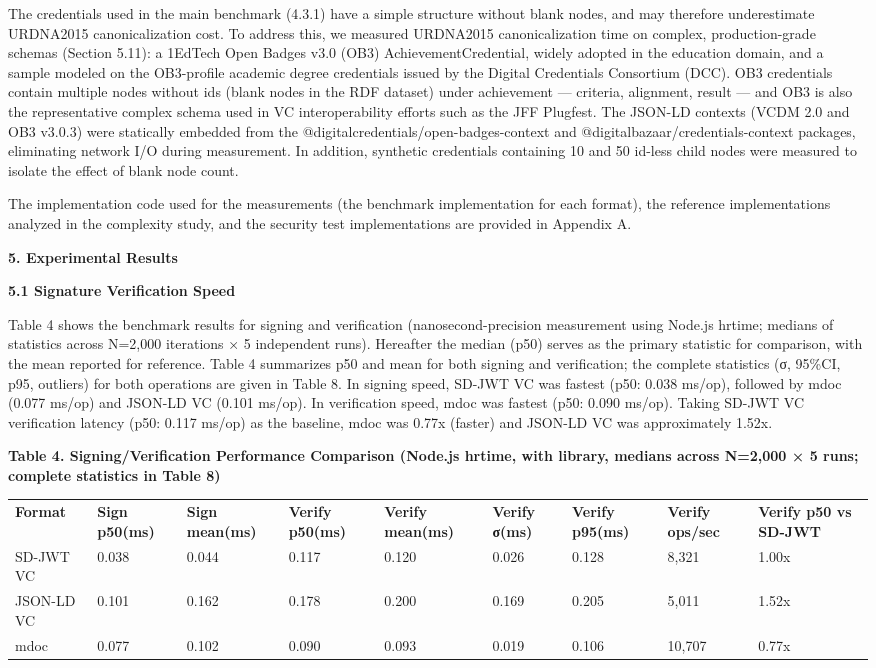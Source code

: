 The credentials used in the main benchmark (4.3.1) have a simple structure without blank nodes, and may therefore underestimate URDNA2015 canonicalization cost. To address this, we measured URDNA2015 canonicalization time on complex, production-grade schemas (Section 5.11): a 1EdTech Open Badges v3.0 (OB3) AchievementCredential, widely adopted in the education domain, and a sample modeled on the OB3-profile academic degree credentials issued by the Digital Credentials Consortium (DCC). OB3 credentials contain multiple nodes without ids (blank nodes in the RDF dataset) under achievement --- criteria, alignment, result --- and OB3 is also the representative complex schema used in VC interoperability efforts such as the JFF Plugfest. The JSON-LD contexts (VCDM 2.0 and OB3 v3.0.3) were statically embedded from the @digitalcredentials/open-badges-context and @digitalbazaar/credentials-context packages, eliminating network I/O during measurement. In addition, synthetic credentials containing 10 and 50 id-less child nodes were measured to isolate the effect of blank node count.

The implementation code used for the measurements (the benchmark implementation for each format), the reference implementations analyzed in the complexity study, and the security test implementations are provided in Appendix A.

\textbf{5. Experimental Results}

\textbf{5.1 Signature Verification Speed}

Table 4 shows the benchmark results for signing and verification (nanosecond-precision measurement using Node.js hrtime; medians of statistics across N=2,000 iterations × 5 independent runs). Hereafter the median (p50) serves as the primary statistic for comparison, with the mean reported for reference. Table 4 summarizes p50 and mean for both signing and verification; the complete statistics (σ, 95\%CI, p95, outliers) for both operations are given in Table 8. In signing speed, SD-JWT VC was fastest (p50: 0.038 ms/op), followed by mdoc (0.077 ms/op) and JSON-LD VC (0.101 ms/op). In verification speed, mdoc was fastest (p50: 0.090 ms/op). Taking SD-JWT VC verification latency (p50: 0.117 ms/op) as the baseline, mdoc was 0.77x (faster) and JSON-LD VC was approximately 1.52x.

\textbf{Table 4. Signing/Verification Performance Comparison (Node.js hrtime, with library, medians across N=2,000 × 5 runs; complete statistics in Table 8)}

\begin{longtable}[]{@{}lllllllll@{}}
\toprule
\endhead
\textbf{Format} & \textbf{Sign p50(ms)} & \textbf{Sign mean(ms)} & \textbf{Verify p50(ms)} & \textbf{Verify mean(ms)} & \textbf{Verify σ(ms)} & \textbf{Verify p95(ms)} & \textbf{Verify ops/sec} & \textbf{Verify p50 vs SD-JWT}\tabularnewline
SD-JWT VC & 0.038 & 0.044 & 0.117 & 0.120 & 0.026 & 0.128 & 8,321 & 1.00x\tabularnewline
JSON-LD VC & 0.101 & 0.162 & 0.178 & 0.200 & 0.169 & 0.205 & 5,011 & 1.52x\tabularnewline
mdoc & 0.077 & 0.102 & 0.090 & 0.093 & 0.019 & 0.106 & 10,707 & 0.77x\tabularnewline
\bottomrule
\end{longtable}

